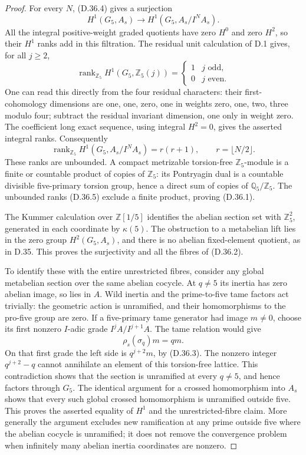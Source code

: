 \begin{proof}
For every \(N\), (D.36.4) gives a
surjection
\[
 H^1(G_5,A_s)\longrightarrow
                 H^1(G_5,A_s/I^NA_s).
\]
All the integral positive-weight
graded quotients have zero \(H^0\)
and zero \(H^2\), so their \(H^1\)
ranks add in this filtration.
The residual unit calculation of
D.1 gives, for all \(j\ge2\),
\[
 \operatorname{rank}_{\mathbb Z_5}
            H^1(G_5,\mathbb Z_5(j))
      =\begin{cases}1&j\text{ odd},\\0&j\text{ even}.
        \end{cases}
\]
One can read this directly from the
four residual characters: their
first-cohomology dimensions are
one, one, zero, one in weights
zero, one, two, three modulo four;
subtract the residual invariant
dimension, one only in weight zero.
The coefficient long exact sequence,
using integral \(H^2=0\), gives
the asserted integral ranks.
Consequently
\[
 \operatorname{rank}_{\mathbb Z_5}
       H^1(G_5,A_s/I^NA_s)
       =r(r+1),\qquad r=\lfloor N/2\rfloor .
                                                        \tag{D.36.5}
\]
These ranks are unbounded.
A compact metrizable torsion-free
\(\mathbb Z_5\)-module is a finite
or countable product of copies of
\(\mathbb Z_5\): its Pontryagin
dual is a countable divisible
five-primary torsion group, hence
a direct sum of copies of
\(\mathbb Q_5/\mathbb Z_5\).
The unbounded ranks (D.36.5)
exclude a finite product, proving
(D.36.1).

The Kummer calculation over
\(\mathbb Z[1/5]\) identifies the
abelian section set with
\(\mathbb Z_5^2\), generated in
each coordinate by \(\kappa(5)\).
The obstruction to a metabelian
lift lies in the zero group
\(H^2(G_5,A_s)\), and there is
no abelian fixed-element quotient,
as in D.35. This proves the
surjectivity and all the fibres
of (D.36.2).

To identify these with the entire
unrestricted fibres, consider any
global metabelian section over the
same abelian cocycle. At \(q\ne5\)
its inertia has zero abelian image,
so lies in \(A\). Wild inertia and
the prime-to-five tame factors act
trivially: the geometric action is
unramified, and their homomorphisms
to the pro-five group are zero.
If a five-primary tame generator
had image \(m\ne0\), choose its
first nonzero \(I\)-adic grade
\(I^jA/I^{j+1}A\). The tame
relation would give
\[
              \rho_s(\sigma_q)m=q m.
\]
On that first grade the left
side is \(q^{j+2}m\), by
(D.36.3). The nonzero integer
\(q^{j+2}-q\) cannot annihilate
an element of this torsion-free
lattice. This contradiction shows
that the section is unramified
at every \(q\ne5\), and hence
factors through \(G_5\).
The identical argument for a
crossed homomorphism into \(A_s\)
shows that every such global
crossed homomorphism is unramified
outside five. This proves the
asserted equality of \(H^1\)
and the unrestricted-fibre claim.
More generally the argument excludes
new ramification at any prime
outside five where the abelian
cocycle is unramified; it does
not remove the convergence problem
when infinitely many abelian
inertia coordinates are nonzero.


\end{proof}
